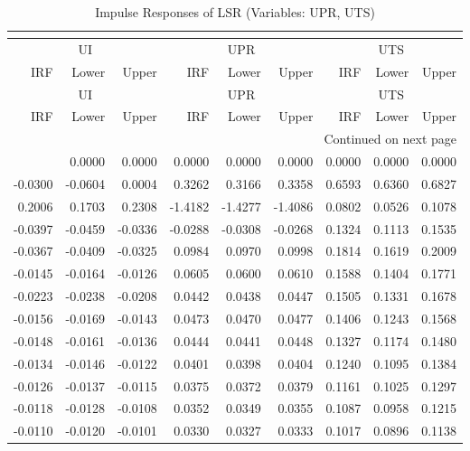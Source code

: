 \begin{longtable}{rrrrrrrrr}
\caption{Impulse Responses of LSR (Variables: UPR, UTS)}\\
\label{tab:lsr_irf_group2}\\
\toprule
\multicolumn{3}{c}{UI} & \multicolumn{3}{c}{UPR} & \multicolumn{3}{c}{UTS} \\
IRF & Lower & Upper & IRF & Lower & Upper & IRF & Lower & Upper \\
\midrule
\endfirsthead
\toprule
\multicolumn{3}{c}{UI} & \multicolumn{3}{c}{UPR} & \multicolumn{3}{c}{UTS} \\
IRF & Lower & Upper & IRF & Lower & Upper & IRF & Lower & Upper \\
\midrule
\endhead
\midrule
\multicolumn{9}{r}{Continued on next page} \\
\midrule
\endfoot
\bottomrule
\endlastfoot
0.0000 & 0.0000 & 0.0000 & 0.0000 & 0.0000 & 0.0000 & 0.0000 & 0.0000 & 0.0000 \\
-0.0300 & -0.0604 & 0.0004 & 0.3262 & 0.3166 & 0.3358 & 0.6593 & 0.6360 & 0.6827 \\
0.2006 & 0.1703 & 0.2308 & -1.4182 & -1.4277 & -1.4086 & 0.0802 & 0.0526 & 0.1078 \\
-0.0397 & -0.0459 & -0.0336 & -0.0288 & -0.0308 & -0.0268 & 0.1324 & 0.1113 & 0.1535 \\
-0.0367 & -0.0409 & -0.0325 & 0.0984 & 0.0970 & 0.0998 & 0.1814 & 0.1619 & 0.2009 \\
-0.0145 & -0.0164 & -0.0126 & 0.0605 & 0.0600 & 0.0610 & 0.1588 & 0.1404 & 0.1771 \\
-0.0223 & -0.0238 & -0.0208 & 0.0442 & 0.0438 & 0.0447 & 0.1505 & 0.1331 & 0.1678 \\
-0.0156 & -0.0169 & -0.0143 & 0.0473 & 0.0470 & 0.0477 & 0.1406 & 0.1243 & 0.1568 \\
-0.0148 & -0.0161 & -0.0136 & 0.0444 & 0.0441 & 0.0448 & 0.1327 & 0.1174 & 0.1480 \\
-0.0134 & -0.0146 & -0.0122 & 0.0401 & 0.0398 & 0.0404 & 0.1240 & 0.1095 & 0.1384 \\
-0.0126 & -0.0137 & -0.0115 & 0.0375 & 0.0372 & 0.0379 & 0.1161 & 0.1025 & 0.1297 \\
-0.0118 & -0.0128 & -0.0108 & 0.0352 & 0.0349 & 0.0355 & 0.1087 & 0.0958 & 0.1215 \\
-0.0110 & -0.0120 & -0.0101 & 0.0330 & 0.0327 & 0.0333 & 0.1017 & 0.0896 & 0.1138 \\
\end{longtable}